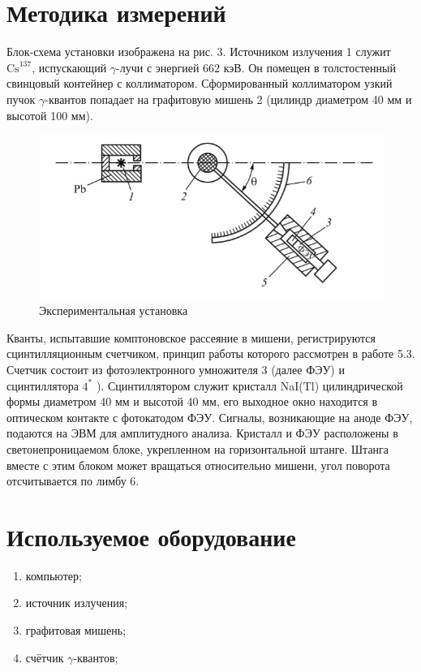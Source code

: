 \documentclass[a4paper, 12pt]{article}
\begin{document}
\section{Методика измерений}

Блок-схема установки изображена на рис. $3 .$ Источником излучения 1 служит $\mathrm{Cs}^{137}$, испускающий $\gamma$-лучи с энергией 662 кэВ. Он помещен в толстостенный свинцовый контейнер с коллиматором. Сформированный коллиматором узкий пучок $\gamma$-квантов попадает на графитовую мишень 2 (цилиндр диаметром 40 мм и высотой 100 мм).

\begin{figure}[h]
\begin{center}
\includegraphics[width = \textwidth]{ust.jpg}
\caption{Экспериментальная установка}
\end{center}
\end{figure}

Кванты, испытавшие комптоновское рассеяние в мишени, регистрируются сцинтилляционным счетчиком, принцип работы которого рассмотрен в работе 5.3. Счетчик состоит из фотоэлектронного умножителя 3 (далее ФЭУ) и сцинтиллятора $4^{*}$ ). Сцинтиллятором служит кристалл NaI(Tl) цилиндрической формы диаметром 40 мм и высотой 40 мм, его выходное окно находится в оптическом контакте с фотокатодом ФЭУ. Сигналы, возникающие на аноде ФЭУ, подаются на ЭВМ для амплитудного анализа. Кристалл и ФЭУ расположены в светонепроницаемом блоке, укрепленном на горизонтальной штанге. Штанга вместе с этим блоком может вращаться относительно мишени, угол поворота отсчитывается по лимбу $6$.

\section{Используемое оборудование}

\begin{enumerate}
    \item компьютер;
    \item источник излучения;
    \item графитовая мишень;
    \item счётчик $\gamma$-квантов;
\end{enumerate}
\end{document}
